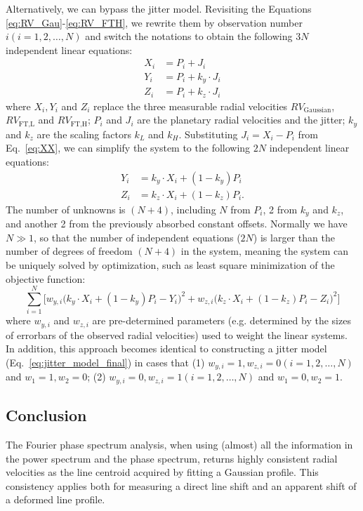 Alternatively, we can bypass the jitter model. Revisiting the Equations \ref{eq:RV_Gau}-\ref{eq:RV_FTH}, we rewrite them by observation number $i (i=1,2,\ldots,N)$ and switch the notations to obtain the following $3N$ independent linear equations:
\begin{align}
	X_i 		&= P_i + J_i				\label{eq:XX} \\
	Y_i 		&= P_i + k_y \cdot J_i	\label{eq:YY} \\
	Z_i 		&= P_i + k_z \cdot J_i 	\label{eq:ZZ}
\end{align}
where $X_i, Y_i$ and $Z_i$ replace the three measurable radial velocities $RV_\text{Gaussian}$, $RV_\text{FT,L}$ and $RV_\text{FT,H}$; $P_i$ and $J_i$ are the planetary radial velocities and the jitter; $k_y$ and $k_z$ are the scaling factors $k_L$ and $k_H$. Substituting $J_i = X_i - P_i$ from Eq.~\ref{eq:XX}, we can simplify the system to the following $2N$ independent linear equations:
\begin{align}
	Y_i 		&= k_y \cdot X_i + (1-k_y)P_i	\label{eq:YYY} \\
	Z_i 		&= k_z \cdot X_i + (1-k_z)P_i	\label{eq:ZZZ}.
\end{align}
The number of unknowns is $(N+4)$, including $N$ from $P_i$, 2 from $k_y$ and $k_z$, and another 2 from the previously absorbed constant offsets. Normally we have $N \gg 1$, so that the number of independent equations ($2N$) is larger than the number of degrees of freedom $(N+4)$ in the system, meaning the system can be uniquely solved by optimization, such as least square minimization of the objective function:
\begin{equation}
	\sum_{i=1}^{N} \Bigg[w_{y,i}\Big(k_y \cdot X_i + (1-k_y)P_i - Y_i \Big)^2 + w_{z,i}\Big(k_z \cdot X_i + (1-k_z)P_i- Z_i \Big)^2 \Bigg]
\label{eq:objective_function}
\end{equation}
where $w_{y,i}$ and $w_{z,i}$ are pre-determined parameters (e.g. determined by the sizes of errorbars of the observed radial velocities) used to weight the linear systems. In addition, this approach becomes identical to constructing a jitter model (Eq.~\ref{eq:jitter_model_final}) in cases that (1) $w_{y,i}=1, w_{z,i}=0 (i=1,2,\ldots,N)$ and $w_1=1, w_2=0$; (2) $w_{y,i}=0, w_{z,i}=1 (i=1,2,\ldots,N)$ and $w_1=0, w_2=1$. 

\subsection{Conclusion}

The Fourier phase spectrum analysis, when using (almost) all the information in the power spectrum and the phase spectrum, returns highly consistent radial velocities as the line centroid acquired by fitting a Gaussian profile. This consistency applies both for measuring a direct line shift and an apparent shift of a deformed line profile. 

